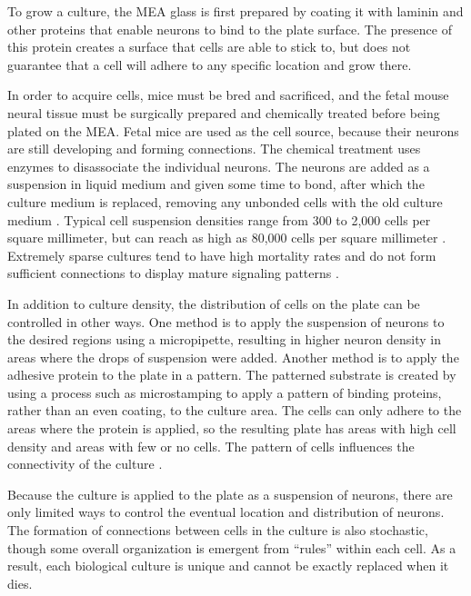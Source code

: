 \documentclass[letterpaper]{article}
\begin{document}
To grow a culture, the MEA glass is first prepared by coating it with laminin and other proteins that enable neurons to bind to the plate surface. 
The presence of this protein creates a surface that cells are able to stick to, but does not guarantee that a cell will adhere to any specific location and grow there. 

In order to acquire cells, mice must be bred and sacrificed, and the fetal mouse neural tissue must be surgically prepared and chemically treated before being plated on the MEA. 
Fetal mice are used as the cell source, because their neurons are still developing and forming connections. 
The chemical treatment uses enzymes to disassociate the individual neurons. 
The neurons are added as a suspension in liquid medium and given some time to bond, after which the culture medium is replaced, removing any unbonded cells with the old culture medium \cite{wagenaar2006extremely}.
Typical cell suspension densities range from 300 to 2,000 cells per square millimeter, but can reach as high as 80,000 cells per square millimeter \cite{shea2009optimization,ruaro2005toward}.
Extremely sparse cultures tend to have high mortality rates and do not form sufficient connections to display mature signaling patterns \cite{shea2009optimization}.

In addition to culture density, the distribution of cells on the plate can be controlled in other ways. 
One method is to apply the suspension of neurons to the desired regions using a micropipette, resulting in higher neuron density in areas where the drops of suspension were added. 
Another method is to apply the adhesive protein to the plate in a pattern. 
The patterned substrate is created by using a process such as microstamping to apply a pattern of binding proteins, rather than an even coating, to the culture area. 
The cells can only adhere to the areas where the protein is applied, so the resulting plate has areas with high cell density and areas with few or no cells.
The pattern of cells influences the connectivity of the culture \cite{sorkin2006compact}.

Because the culture is applied to the plate as a suspension of neurons, there are only limited ways to control the eventual location and distribution of neurons. 
The formation of connections between cells in the culture is also stochastic, though some overall organization is emergent from ``rules'' within each cell. 
As a result, each biological culture is unique and cannot be exactly replaced when it dies. 
\end{document}
